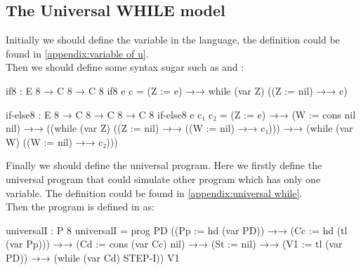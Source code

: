 \subsection{The Universal WHILE model}\label{definition: simulation}
Initially we should define the variable in the \WHILE language, the definition could be found in \ref{appendix:variable of u}.\\
Then we should define some syntax sugar such as  and :
\begin{code}[fontsize=\footnotesize]
if8 : E 8 → C 8 → C 8
if8 e c = (Z := e) →→ while (var Z) ((Z := nil) →→ c)

if-else8 : E 8 → C 8 → C 8 → C 8
if-else8 e c₁ c₂ = (Z := e) →→
                   (W := cons nil nil) →→
                   ((while (var Z)
                           ((Z := nil) →→
                           ((W := nil) →→
                           c₁))) →→
                   (while (var W)
                          ((W := nil) →→
                          c₂)))
\end{code}
Finally we should define the universal \WHILE program.
Here we firstly define the universal \WHILE program that could simulate other \WHILE program which has only one variable.
The definition could be found in \ref{appendix:universal while}.\\
Then the program is defined in \Agda as:
\begin{code}
universalI : P 8
universalI = prog PD ((Pp := hd (var PD))
                     →→
                     (Cc := hd (tl (var Pp)))
                     →→
                     (Cd := cons (var Cc) nil)
                     →→
                     (St := nil)
                     →→
                     (V1 := tl (var PD))
                     →→
                     (while (var Cd) STEP-I))
                  V1
\end{code}
